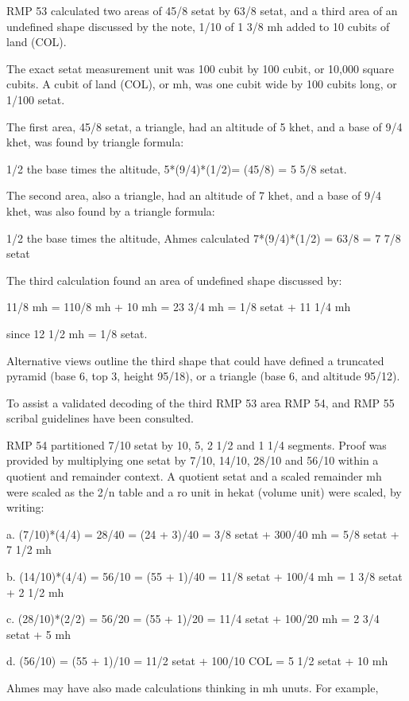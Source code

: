 \documentclass[12pt]{article}
\begin{document}
RMP 53 calculated two areas of 45/8 setat by 63/8 setat, and a third area of an undefined shape discussed by the note, 1/10 of 1 3/8 mh added to 10 cubits of land (COL). 

The exact setat measurement unit was 100 cubit by 100 cubit, or 10,000 square cubits. A cubit of land (COL), or mh, was one cubit wide by 100 cubits long, or 1/100 setat.

The first area, 45/8 setat, a triangle, had an altitude of 5 khet,  and a base of 9/4 khet, was found by triangle formula: 

1/2 the base times the altitude, 5*(9/4)*(1/2)= (45/8) = 5 5/8 setat.

The second area, also a triangle, had an altitude of 7 khet, and a base of 9/4 khet, was also found by a triangle formula: 

1/2 the base times the altitude, Ahmes calculated 7*(9/4)*(1/2) = 63/8 = 7 7/8 setat   

The third calculation found an area of undefined shape discussed by:

11/8 mh = 110/8 mh + 10 mh = 23 3/4 mh = 1/8 setat + 11 1/4 mh

since 12 1/2 mh = 1/8 setat.

Alternative views outline the third shape that could have defined a truncated pyramid (base 6, top 3, height 95/18), or a triangle (base 6, and altitude 95/12).

To assist a validated decoding of the third RMP 53 area RMP 54, and RMP 55 scribal guidelines have been consulted.

RMP 54 partitioned 7/10 setat by 10, 5, 2 1/2 and 1 1/4 segments. Proof was provided by multiplying one setat by 7/10, 14/10, 28/10 and 56/10 within a quotient and remainder context. A quotient setat and a scaled remainder mh were scaled as the 2/n table and a ro unit in hekat (volume unit) were scaled, by writing:  

a. (7/10)*(4/4) = 28/40 = (24 + 3)/40 = 3/8 setat + 300/40 mh = 5/8 setat + 7 1/2 mh

b. (14/10)*(4/4) = 56/10 = (55 + 1)/40 = 11/8 setat + 100/4 mh = 1 3/8 setat + 2 1/2 mh

c. (28/10)*(2/2) = 56/20 = (55 + 1)/20 = 11/4 setat + 100/20 mh = 2 3/4 setat + 5 mh

d. (56/10) = (55 + 1)/10 = 11/2 setat + 100/10 COL = 5 1/2 setat + 10 mh    

Ahmes may have also made calculations thinking in mh unuts. For example, 
\end{document}
